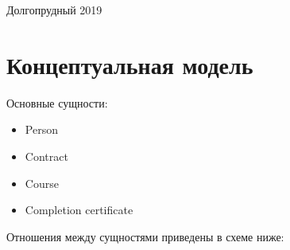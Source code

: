 \documentclass[a4paper]{article}
\begin{document}
\vspace{\baselineskip}
\vspace{\baselineskip}
\vspace{\baselineskip}
\vspace{\baselineskip}
\vspace{\baselineskip}
\vspace{\baselineskip}
\vspace{\baselineskip}
\vspace{\baselineskip}
\vspace{\baselineskip}
\vspace{\baselineskip}
\vspace{\baselineskip}
\vspace{\baselineskip}
\vspace{\baselineskip}
\vspace{\baselineskip}
\vspace{\baselineskip}
\vspace{\baselineskip}
\vspace{\baselineskip}
\vspace{\baselineskip}
\vspace{\baselineskip}
\vspace{\baselineskip}
\vspace{\baselineskip}
\vspace{\baselineskip}
\vspace{\baselineskip}
\vspace{\baselineskip}
\vspace{\baselineskip}
\begin{center} Долгопрудный 2019 \end{center}
\thispagestyle{empty} %
 
 
\newpage
 
\newpage
\section{Концептуальная модель}
Основные сущности:
\begin{itemize}
    \item Person
    \item Contract
    \item Course
    \item Completion certificate
\end{itemize}
Отношения между сущностями приведены в схеме ниже:
\end{document}

